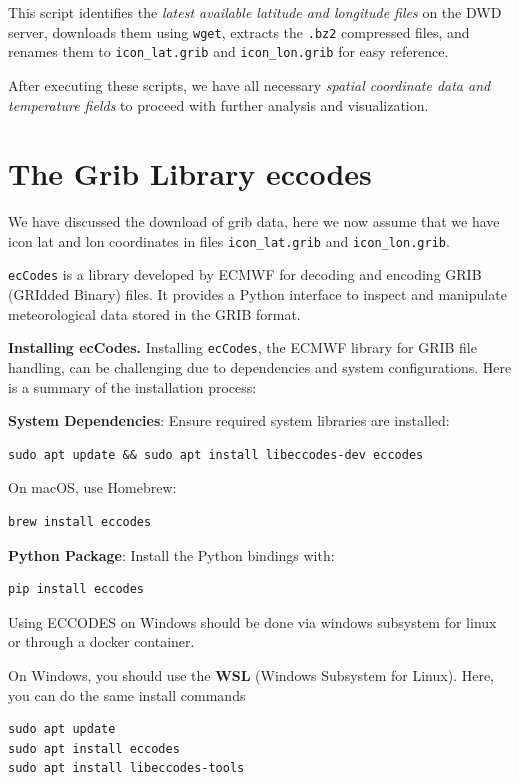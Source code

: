 This script identifies the \emph{latest available latitude and longitude files} on the DWD server, downloads them using \texttt{wget}, extracts the \texttt{.bz2} compressed files, and renames them to \texttt{icon\_lat.grib} and \texttt{icon\_lon.grib} for easy reference.

After executing these scripts, we have all necessary \emph{spatial coordinate data and temperature fields} to proceed with further analysis and visualization.


%
\section{The Grib Library eccodes}

We have discussed the download of grib data, here we now assume that we have icon lat and lon coordinates in files \texttt{icon\_lat.grib} and  \texttt{icon\_lon.grib}. 

\texttt{ecCodes} is a library developed by ECMWF for decoding and encoding GRIB (GRIdded Binary) files. It provides a Python interface to inspect and manipulate meteorological data stored in the GRIB format.

{\bf Installing ecCodes.} Installing \texttt{ecCodes}, the ECMWF library for GRIB file handling, can be challenging due to dependencies and system configurations. Here is a summary of the installation process:

{\bf System Dependencies}: Ensure required system libraries are installed:
\begin{lstlisting}
sudo apt update && sudo apt install libeccodes-dev eccodes
\end{lstlisting}
On macOS, use Homebrew:
\begin{lstlisting}
brew install eccodes
\end{lstlisting}

{\bf Python Package}: Install the Python bindings with:
\begin{verbatim}
pip install eccodes
\end{verbatim}

\begin{recommendationbox}
Using ECCODES on Windows should be done via windows subsystem for linux or through a docker container. 
\end{recommendationbox}

On Windows, you should use the {\bf WSL} (Windows Subsystem for Linux). Here, you can do the same install commands
\begin{lstlisting}
sudo apt update
sudo apt install eccodes
sudo apt install libeccodes-tools
\end{lstlisting}

